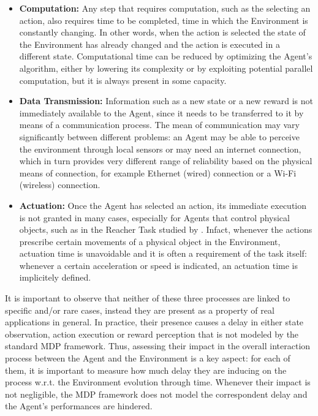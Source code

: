     \begin{itemize}
        \item \textbf{Computation:} Any step that requires computation, such as the selecting an action, also requires time to be completed, time in which the Environment is constantly changing. In other words, when the action is selected the state of the Environment has already changed and the action is executed in a different state. Computational time can be reduced by optimizing the Agent's algorithm, either by lowering its complexity or by exploiting potential parallel computation, but it is always present in some capacity.
        \item \textbf{Data Transmission:} Information such as a new state or a new reward is not immediately available to the Agent, since it needs to be transferred to it by means of a communication process. The mean of communication may vary significantly between different problems: an Agent may be able to perceive the environment through local sensors or may need an internet connection, which in turn provides very different range of reliability based on the physical means of connection, for example Ethernet (wired) connection or a Wi-Fi (wireless) connection.
        \item \textbf{Actuation:} Once the Agent has selected an action, its immediate execution is not granted in many cases, especially for Agents that control physical objects, such as in the Reacher Task studied by . Infact, whenever the actions prescribe certain movements of a physical object in the Environment, actuation time is unavoidable and it is often a requirement of the task itself: whenever a certain acceleration or speed is indicated, an actuation time is implicitely defined. 
    \end{itemize}
    \noindent
    It is important to observe that neither of these three processes are linked to specific and/or rare cases, instead they are present as a property of real applications in general. In practice, their presence causes a delay in either state observation, action execution or reward perception that is not modeled by the standard MDP framework. Thus, assessing their impact in the overall interaction process between the Agent and the Environment is a key aspect: for each of them, it is important to measure how much delay they are inducing on the process w.r.t. the Environment evolution through time. Whenever their impact is not negligible, the MDP framework does not model the correspondent delay and the Agent's performances are hindered. 
